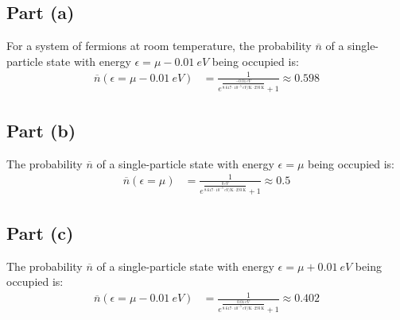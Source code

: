 \documentclass{article}
\begin{document}
\clearpage

\subsection*{Part (a)}
For a system of fermions at room temperature, the probability $\overline{n}$ of a single-particle state with energy $\epsilon = \mu - 0.01~\unit{eV}$ being occupied is:
\begin{equation}
    \begin{split}
        \overline{n}\left(\epsilon = \mu - 0.01~\unit{eV}\right) & = \frac{1}{e^{\frac{-0.01~\unit{eV}}{8.617 \cdot 10^{-5}~\unit{eV\per\kelvin} \cdot 293~\unit{\kelvin}}} + 1} \approx 0.598
    \end{split}
\end{equation}
\subsection*{Part (b)}
The probability $\overline{n}$ of a single-particle state with energy $\epsilon = \mu$ being occupied is:
\begin{equation}
    \begin{split}
        \overline{n}\left(\epsilon = \mu\right) & = \frac{1}{e^{\frac{0~\unit{eV}}{8.617 \cdot 10^{-5}~\unit{eV\per\kelvin} \cdot 293~\unit{\kelvin}}} + 1} \approx 0.5
    \end{split}
\end{equation}
\subsection*{Part (c)}
The probability $\overline{n}$ of a single-particle state with energy $\epsilon = \mu + 0.01~\unit{eV}$ being occupied is:
\begin{equation}
    \begin{split}
        \overline{n}\left(\epsilon = \mu - 0.01~\unit{eV}\right) & = \frac{1}{e^{\frac{0.01~\unit{eV}}{8.617 \cdot 10^{-5}~\unit{eV\per\kelvin} \cdot 293~\unit{\kelvin}}} + 1} \approx 0.402
    \end{split}
\end{equation}

\clearpage

\end{document}
